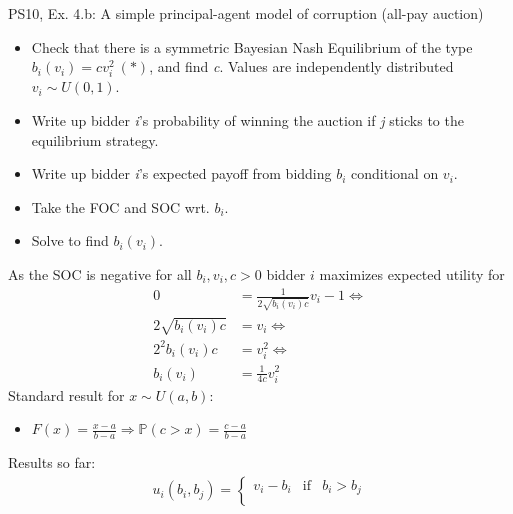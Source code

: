 \begin{frame}{PS10, Ex. 4.b: A simple principal-agent model of corruption (all-pay auction)}
    \begin{itemize}
      \item[(b)] Check that there is a symmetric Bayesian Nash Equilibrium of the type $b_i(v_i) = cv_i^2\ (*)$, and find \textit{c}. Values are independently distributed $v_i\sim U(0, 1)$.
    \end{itemize} \vspace{-8pt}
    \begin{multicols}{2}
      \begin{itemize}
        \item[Step 1:] Write up bidder \textit{i}'s probability of winning the auction if \textit{j} sticks to the equilibrium strategy.
        \item[Step 2:] Write up bidder \textit{i}'s expected payoff from bidding $b_i$ conditional on $v_i$.
        \item[Step 3:] Take the FOC and SOC wrt. $b_i$.
        \item[Step 4:] Solve to find $b_i(v_i)$.
      \end{itemize} \vspace{-6pt}
      As the SOC is negative for all $b_i,v_i,c>0$ bidder $i$ maximizes expected utility for \vspace{-6pt}
      \begin{align*}
        0&=\frac{1}{2\sqrt{b_i(v_i)c}}v_i-1\Leftrightarrow\\
        2\sqrt{b_i(v_i)c}&=v_i\Leftrightarrow\\
        2^2b_i(v_i)c&=v_i^2\Leftrightarrow\\
        b_i(v_i)&=\frac{1}{4c}v_i^2
      \end{align*}
      \vfill\null\columnbreak
      Standard result for $x\sim U(a, b):$ \vspace{-6pt}
      \begin{itemize}
        \item[CDF:] $F(x)=\frac{x-a}{b-a}\Rightarrow\mathbb{P}(c>x)=\frac{c-a}{b-a}$
      \end{itemize}
      \vspace{-6pt}
      Results so far: \vspace{-6pt}
      \begin{align*}
        u_i(b_i,b_j)=\left\{\begin{array}{lcl}
          v_i-b_i           & \text{if} & b_i>b_j \\

\end{array}
\end{align*}
\end{multicols}
\end{frame}
